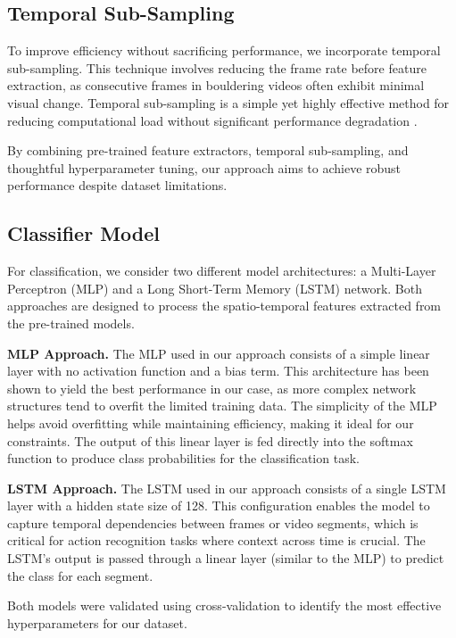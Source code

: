 \subsection{Temporal Sub-Sampling}
To improve efficiency without sacrificing performance, we incorporate temporal sub-sampling. This technique involves reducing the frame rate before feature extraction, as consecutive frames in bouldering videos often exhibit minimal visual change. Temporal sub-sampling is a simple yet highly effective method for reducing computational load without significant performance degradation \cite{impact-of-temporal-subsampling}.

By combining pre-trained feature extractors, temporal sub-sampling, and thoughtful hyperparameter tuning, our approach aims to achieve robust performance despite dataset limitations.

\subsection{Classifier Model}

For classification, we consider two different model architectures: a Multi-Layer Perceptron (MLP) and a Long Short-Term Memory (LSTM) network. Both approaches are designed to process the spatio-temporal features extracted from the pre-trained models.

\noindent\textbf{MLP Approach.} The MLP used in our approach consists of a simple linear layer with no activation function and a bias term. This architecture has been shown to yield the best performance in our case, as more complex network structures tend to overfit the limited training data. The simplicity of the MLP helps avoid overfitting while maintaining efficiency, making it ideal for our constraints. The output of this linear layer is fed directly into the softmax function to produce class probabilities for the classification task.

\noindent\textbf{LSTM Approach.} The LSTM used in our approach consists of a single LSTM layer with a hidden state size of 128. This configuration enables the model to capture temporal dependencies between frames or video segments, which is critical for action recognition tasks where context across time is crucial. The LSTM’s output is passed through a linear layer (similar to the MLP) to predict the class for each segment.

Both models were validated using cross-validation to identify the most effective hyperparameters for our dataset.

